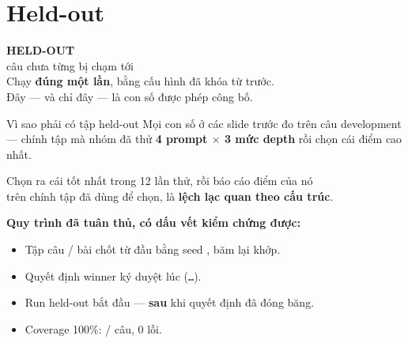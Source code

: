 \section{Held-out}

\begin{frame}[plain]
  \vfill
  \begin{center}
    {\color{brandaccent}\Large\textbf{HELD-OUT}}\\[0.4em]
    {\Large \NumNHeldout{} câu chưa từng bị chạm tới}\\[1em]
    {\small\color{brandmuted}
     Chạy \textbf{đúng một lần}, bằng cấu hình đã khóa từ trước.\\
     Đây --- và chỉ đây --- là con số được phép công bố.}
  \end{center}
  \vfill
\end{frame}

\begin{frame}[shrink=20]{Vì sao phải có tập held-out}
  \small
  Mọi con số ở các slide trước đo trên \NumNDev{} câu development --- chính tập
  mà nhóm đã thử \textbf{4 prompt $\times$ 3 mức depth} rồi chọn cái điểm cao nhất.

  \begin{center}
    \colorbox{brandrule}{\parbox{0.88\textwidth}{\centering\vspace{0.3em}
      Chọn ra cái tốt nhất trong 12 lần thử, rồi báo cáo điểm của nó\\
      trên chính tập đã dùng để chọn, là \textbf{lệch lạc quan theo cấu trúc}.\vspace{0.3em}}}
  \end{center}

  \vspace{0.5em}
  \textbf{Quy trình đã tuân thủ, có dấu vết kiểm chứng được:}
  \begin{itemize}\small
    \item Tập \NumNHeldout{} câu / \NumNArticles{} bài chốt từ đầu bằng seed \NumHeldoutSeed{},
          băm lại khớp.
    \item Quyết định winner ký duyệt lúc \NumWinnerApprovedAt{}
          (\texttt{\NumHoDecisionSha\ldots}).
    \item Run held-out bắt đầu \NumHoStartedAt{} --- \textbf{sau} khi quyết định đã đóng băng.
    \item Coverage 100\%: \NumNHeldout{}/\NumNHeldout{} câu, 0 lỗi.
  \end{itemize}

\end{frame}

